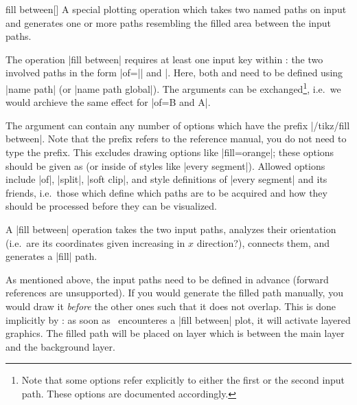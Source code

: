 \begin{addplotoperation}[]{fill between}{[]}
	A special plotting operation which takes two named paths on input and generates one or more paths resembling the filled area between the input paths.

\begin{codeexample}[]
\end{codeexample}
	The operation |fill between| requires at least one input key within : the two involved paths in the form |of=|| and |. Here, both  and  need to be defined using |name path| (or |name path global|). The arguments can be exchanged\footnote{Note that some options refer explicitly to either the first or the second input path. These options are documented accordingly.}, i.e.\ we would archieve the same effect for |of=B and A|.

	The argument  can contain any number of options which have the prefix |/tikz/fill between|. Note that the prefix refers to the reference manual, you do not need to type the prefix. This excludes drawing options like |fill=orange|; these options should be given as  (or inside of styles like |every segment|). Allowed options include |of|, |split|, |soft clip|, and style definitions of |every segment| and its friends, i.e.\ those which define which paths are to be acquired and how they should be processed before they can be visualized.

	A |fill between| operation takes the two input paths, analyzes their orientation (i.e.\ are its coordinates given increasing in $x$ direction?), connects them, and generates a |fill| path. 
	
	As mentioned above, the input paths need to be defined in advance (forward references are unsupported). If you would generate the filled path manually, you would draw it \emph{before} the other ones such that it does not overlap. This is done implicitly by \PGFPlots: as soon as \PGFPlots\ encounteres a |fill between| plot, it will activate layered graphics. The filled path will be placed on layer  which is between the main layer and the background layer.\label{Layer!pre main} 


\end{addplotoperation}
